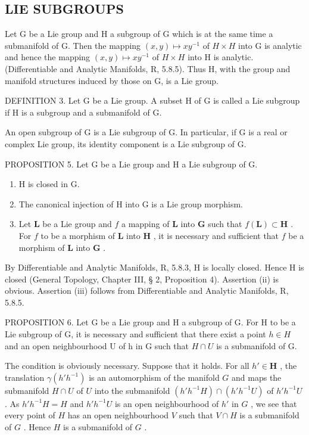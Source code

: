 \subsection{LIE SUBGROUPS}

Let G be a Lie group and H a subgroup of G which is at the same time a submanifold of G. Then the mapping \((x,y)\mapsto xy^{-1}\) of \(H\times H\) into G is analytic and hence the mapping \((x,y)\mapsto xy^{-1}\) of \(H\times H\) into H is analytic. (Differentiable and Analytic Manifolds, R, 5.8.5). Thus H, with the group and manifold structures induced by those on G, is a Lie group.

DEFINITION 3. Let G be a Lie group. A subset H of G is called a Lie subgroup if H is a subgroup and a submanifold of G.

An open subgroup of G is a Lie subgroup of G. In particular, if G is a real or complex Lie group, its identity component is a Lie subgroup of G.

PROPOSITION 5. Let G be a Lie group and H a Lie subgroup of G.

\begin{enumerate}
\def\labelenumi{(\roman{enumi})}
\item
  H is closed in G.
\item
  The canonical injection of H into G is a Lie group morphism.
\item
  Let \(\mathbf{L}\) be a Lie group and \(f\) a mapping of \(\mathbf{L}\) into \(\mathbf{G}\) such that \(f(\mathbf{L}) \subset \mathbf{H}\) . For \(f\) to be a morphism of \(\mathbf{L}\) into \(\mathbf{H}\) , it is necessary and sufficient that \(f\) be a morphism of \(\mathbf{L}\) into \(\mathbf{G}\) .
\end{enumerate}

By Differentiable and Analytic Manifolds, R, 5.8.3, H is locally closed. Hence H is closed (General Topology, Chapter III, § 2, Proposition 4). Assertion (ii) is obvious. Assertion (iii) follows from Differentiable and Analytic Manifolds, R, 5.8.5.

PROPOSITION 6. Let G be a Lie group and H a subgroup of G. For H to be a Lie subgroup of G, it is necessary and sufficient that there exist a point \(h \in H\) and an open neighbourhood U of h in G such that \(H \cap U\) is a submanifold of G.

The condition is obviously necessary. Suppose that it holds. For all \(h' \in \mathbf{H}\) , the translation \(\gamma (h'h^{-1})\) is an automorphism of the manifold \(G\) and maps the submanifold \(H \cap U\) of \(U\) into the submanifold \((h'h^{-1}H) \cap (h'h^{-1}U)\) of \(h'h^{-1}U\) . As \(h'h^{-1}H = H\) and \(h'h^{-1}U\) is an open neighbourhood of \(h'\) in \(G\) , we see that every point of \(H\) has an open neighbourhood \(V\) such that \(V \cap H\) is a submanifold of \(G\) . Hence \(H\) is a submanifold of \(G\) .

